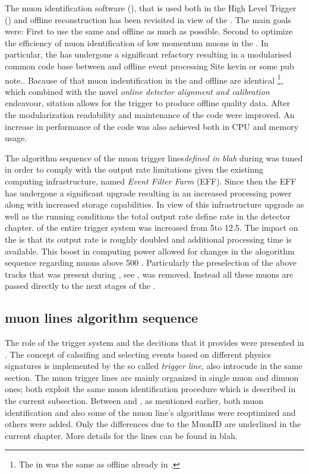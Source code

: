 
The muon identification software \cite{LHCb-PUB-2009-013,LHCb-PUB-2010-002} (\muonID),
that is used both in the High Level Trigger (\hlt) \cite{LHCb-PUB-2011-017} and offline reconstruction has been
revisited in view of the \lhc \runtwo. The main goals were: First to use the same \muonID and offline as much as
possible. Second to optimize the efficiency of muon identification of low momentum muons in the \hlt.
In particular, the \muonID has undergone a significant refactory resulting in a modularised common code base
between \hlt and offline event processing {\color{red} Site kevin or some pub note.}. Bacause of that
muon indentification in the \hltone and offline are identical \footnote{The \muonID in \hlttwo was the same as offline already in \runone.},
which combined with the novel {\it online detector alignment and calibration} endeavour, {\color{red} sitation} allows for the trigger to produce offline quality data.
After the modularization readability and maintenance of the code were improved. An increase in performance
of the \muonID code was also achieved both in CPU and memory usage.

The algorithm sequence of the \hltone muon trigger lines{\it defined in blah} during \runone was tuned in order to
comply with the output rate limitations given the existinng computing infrastructure,
named {\it Event Filter Farm} (EFF). Since then the EFF has undergone a significant upgrade resulting in an
increased processing power along with increased storage capabilities. In view of this infrastructure upgrade
as well as the \runtwo \lhc running conditions the total output rate{\color{red} define rate in the detector chapter.} of the entire trigger system was increased
from 5\khz to 12.5\khz. The impact on the \hltone is that its output rate is roughly doubled and additional processing time is available.
This boost in computing power allowed for changes in the \muonID alogorithm sequence regarding muons above 500 \mevc.
Particularly the preselection of the above tracks that was present during \runone, see ,
was removed. Instead all these muons are passed directly to the next stages of the \muonID.

\subsection{\hltone muon lines algorithm sequence}
\label{hlt1run2}

The role of the trigger system and the decitions that it provides were presented in \secref{}.
The concept of calssifing and selecting events based on different physics signatures is implemented by
the so called {\it trigger line}, also introcude in the same section. The \hltone muon trigger lines are
mainly organized in single muon and dimuon ones; both exploit the same muon identification procedure which
is described in the current subsection. Between \runone and \runtwo, as mentioned earlier, both muon identification
and also some of the muon line's algorithms were reoptimized and others were added. Only the differences due
to the MuonID are underlined in the current chapter. { More details for the lines can be found in blah.}

